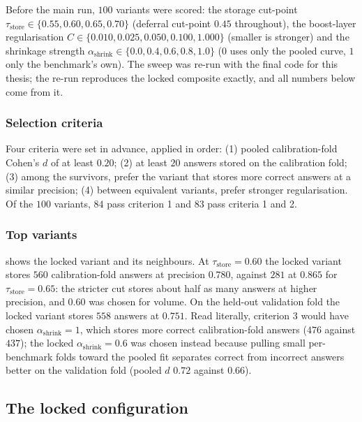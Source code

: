 Before the main run, $100$ variants were scored: the storage cut-point $\tau_{\text{store}} \in \{0.55, 0.60, 0.65, 0.70\}$ (deferral cut-point $0.45$ throughout), the boost-layer regularisation $C \in \{0.010, 0.025, 0.050, 0.100, 1.000\}$ (smaller is stronger) and the shrinkage strength $\alpha_{\text{shrink}} \in \{0.0, 0.4, 0.6, 0.8, 1.0\}$ ($0$ uses only the pooled curve, $1$ only the benchmark's own). The sweep was re-run with the final code for this thesis; the re-run reproduces the locked composite exactly, and all numbers below come from it.

\subsubsection{Selection criteria}
\label{sec:adj-criteria}

Four criteria were set in advance, applied in order: (1) pooled calibration-fold Cohen's $d$ of at least $0.20$; (2) at least $20$ answers stored on the calibration fold; (3) among the survivors, prefer the variant that stores more correct answers at a similar precision; (4) between equivalent variants, prefer stronger regularisation. Of the $100$ variants, $84$ pass criterion 1 and $83$ pass criteria 1 and 2.

\subsubsection{Top variants}
\label{sec:adj-top}

 shows the locked variant and its neighbours. At $\tau_{\text{store}} = 0.60$ the locked variant stores $560$ calibration-fold answers at precision $0.780$, against $281$ at $0.865$ for $\tau_{\text{store}} = 0.65$: the stricter cut stores about half as many answers at higher precision, and $0.60$ was chosen for volume. On the held-out validation fold the locked variant stores $558$ answers at $0.751$. Read literally, criterion 3 would have chosen $\alpha_{\text{shrink}} = 1$, which stores more correct calibration-fold answers ($476$ against $437$); the locked $\alpha_{\text{shrink}} = 0.6$ was chosen instead because pulling small per-benchmark folds toward the pooled fit separates correct from incorrect answers better on the validation fold (pooled $d$ $0.72$ against $0.66$).



\subsection{The locked configuration}
\label{sec:adj-locked}

